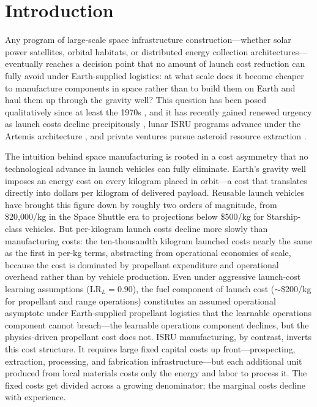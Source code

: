 \documentclass[preprint,12pt]{elsarticle}
\begin{document}
\linenumbers

\section{Introduction}
\label{sec:introduction}

Any program of large-scale space infrastructure construction---whether solar power satellites, orbital habitats, or distributed energy collection architectures---eventually reaches a decision point that no amount of launch cost reduction can fully avoid under Earth-supplied logistics: at what scale does it become cheaper to manufacture components in space rather than to build them on Earth and haul them up through the gravity well? This question has been posed qualitatively since at least the 1970s \cite{oneill1974,oneill1976}, and it has recently gained renewed urgency as launch costs decline precipitously \cite{jones2018}, lunar ISRU programs advance under the Artemis architecture \cite{sanders2015}, and private ventures pursue asteroid resource extraction \cite{elvis2012,andrews2015}.

The intuition behind space manufacturing is rooted in a cost asymmetry that no technological advance in launch vehicles can fully eliminate. Earth's gravity well imposes an energy cost on every kilogram placed in orbit---a cost that translates directly into dollars per kilogram of delivered payload. Reusable launch vehicles have brought this figure down by roughly two orders of magnitude, from \$20{,}000/kg in the Space Shuttle era to projections below \$500/kg for Starship-class vehicles. But per-kilogram launch costs decline more slowly than manufacturing costs: the ten-thousandth kilogram launched costs nearly the same as the first in per-kg terms, abstracting from operational economies of scale, because the cost is dominated by propellant expenditure and operational overhead rather than by vehicle production. Even under aggressive launch-cost learning assumptions (LR$_L = 0.90$), the fuel component of launch cost ($\sim$\$200/kg for propellant and range operations) constitutes an assumed operational asymptote under Earth-supplied propellant logistics that the learnable operations component cannot breach---the learnable operations component declines, but the physics-driven propellant cost does not. ISRU manufacturing, by contrast, inverts this cost structure. It requires large fixed capital costs up front---prospecting, extraction, processing, and fabrication infrastructure---but each additional unit produced from local materials costs only the energy and labor to process it. The fixed costs get divided across a growing denominator; the marginal costs decline with experience.
\end{document}
